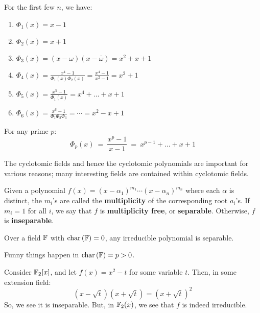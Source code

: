 \begin{xmp}[source=Primary Source Material]
    For the first few $ n $, we have:
    \begin{enumerate}
        \item $ \Phi_{1}(x) = x-1 $
        \item $ \Phi_{2}(x) = x+1 $
        \item $ \Phi_{3}(x) = (x-\omega)(x-\bar{\omega}) = x^{2}+x+1 $
        \item $ \Phi_{4}(x) = \frac{x^{4}-1}{\Phi_{1}(x)\Phi_{2}(x)}
            = \frac{x^{4}-1}{x^{2}-1} = x^{2}+1 $
        \item $ \Phi_{5}(x) = \frac{x^{5}-1}{\Phi_{1}(x)} = x^{4}+\dots+x+1 $
        \item $ \Phi_{6}(x) = \frac{x^{6}-1}{\Phi_{1}\Phi_{2}\Phi_{3}}
            = \cdots = x^{2}-x+1 $
    \end{enumerate}
    For any prime $ p $:
    \begin{equation*}
        \Phi_{p}(x) \ = \ \frac{x^{p}-1}{x-1} \ = \ x^{p-1}+\dots+x+1
    \end{equation*}
\end{xmp}
The cyclotomic fields and hence the cyclotomic polynomials are important for
various reasons; many interesting fields are contained within cyclotomic fields.

\begin{defn}
    Given a polynomial $ f(x) = (x-\alpha_{1})^{m_{1}}\cdots
    (x-\alpha_{n})^{m_{n}} $ where each $ \alpha $ is distinct, the $ m_{i} $'s
    are called the \textbf{multiplicity} of the corresponding root $ a_{i} $'s.
    \vsp
    If $ m_{i}=1 $ for all $ i $, we say that $ f $ is \textbf{multiplicity
    free}, or \textbf{separable}. Otherwise, $ f $ is \textbf{inseparable}.
\end{defn}

\begin{lm}
    Over a field $ \mathbb{F} $ with $ \operatorname{char\,}(\mathbb{F}) = 0 $, any irreducible polynomial is
    separable.
\end{lm}
Funny things happen in $ \operatorname{char\,}(\mathbb{F}) = p > 0 $.

\begin{xmp}[source=Primary Source Material]
    Consider $ \mathbb{F}_{2}[x] $, and let $ f(x) = x^{2}-t $ for some variable $ t $.
    Then, in some extension field:
    \begin{equation*}
        (x-\sqrt{t})(x+\sqrt{t}) = (x+\sqrt{t})^{2}
    \end{equation*}
    So, we see it is inseparable. But, in $ \mathbb{F}_{2}(x) $, we see that $ f $ is
    indeed irreducible.
\end{xmp}

